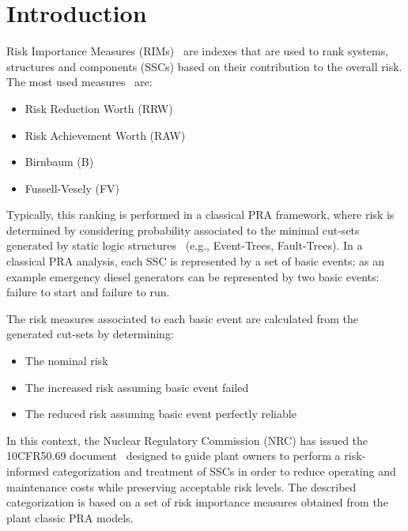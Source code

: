 \section{Introduction}
\label{sec:introduction}

Risk Importance Measures (RIMs)~\cite{} are indexes that are used to rank systems, structures and 
components (SSCs) based on their contribution to the overall risk. The most used measures~\cite{} 
are: 
\begin{itemize}
  \item Risk Reduction Worth (RRW)
  \item Risk Achievement Worth (RAW)
  \item Birnbaum (B)
  \item Fussell-Vesely (FV)
\end{itemize}

Typically, this ranking is performed in a classical PRA framework, where risk is determined by 
considering probability associated to the minimal cut-sets generated by static logic 
structures~\cite{} (e.g., Event-Trees, Fault-Trees). In a classical PRA analysis, each SSC 
is represented by a set of basic events; as an example emergency diesel generators can be 
represented by two basic events: failure to start and failure to run. 

The risk measures associated to each basic event are calculated from the generated cut-sets 
by determining: 
\begin{itemize}
  \item The nominal risk 
  \item The increased risk assuming basic event failed
  \item The reduced risk assuming basic event perfectly reliable 
\end{itemize}

In this context, the Nuclear Regulatory Commission (NRC) has issued the 10CFR50.69 
document~\cite{} designed to guide plant owners to perform a risk-informed categorization and 
treatment of SSCs in order to reduce operating and maintenance costs while preserving 
acceptable risk levels. The described categorization is based on a set of risk importance 
measures obtained from the plant classic PRA models.

